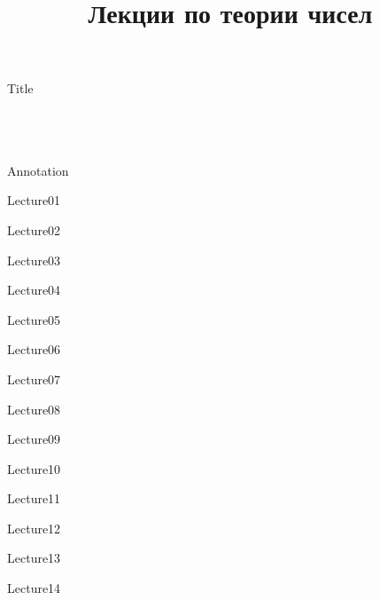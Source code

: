 \documentclass[11pt]{article}
\theoremstyle{plain}
\theoremstyle{definition}
\theoremstyle{remark}
\begin{document}
\title{Лекции по теории чисел}


\thispagestyle{empty}

{Title}

\newpage
~\\~\\~\\
{Annotation}


\newpage

\tableofcontents

\newpage


{Lecture01}

{Lecture02}

{Lecture03}

{Lecture04}

{Lecture05}

{Lecture06}

{Lecture07}

{Lecture08}

{Lecture09}

{Lecture10}

{Lecture11}

{Lecture12}

{Lecture13}

{Lecture14}
\end{document}
